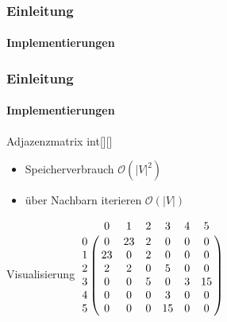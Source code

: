 \begin{frame}
    \frametitle{Einleitung}
    \framesubtitle{Implementierungen}
\end{frame}

\begin{frame}
    \frametitle{Einleitung}
    \framesubtitle{Implementierungen}
    \begin{KITexampleblock}{Adjazenzmatrix}
    int[][]
    \begin{itemize}
        \item Speicherverbrauch \( \mathcal{O}(|V|^2)\)
        \item über Nachbarn iterieren \( \mathcal{O}(|V|)\)
    \end{itemize}
    \end{KITexampleblock}
    \vspace{0.001em}
    \begin{KITinfoblock}{Visualisierung}
        $\bordermatrix{
  & 0  & 1  & 2  & 3  & 4  & 5  \cr
0 & 0  & 23 & 2  & 0  & 0  & 0  \cr
1 & 23 & 0  & 2  & 0  & 0  & 0  \cr
2 & 2  & 2  & 0  & 5  & 0  & 0  \cr
3 & 0  & 0  & 5  & 0  & 3  & 15 \cr
4 & 0  & 0  & 0  & 3  & 0  & 0  \cr
5 & 0  & 0  & 0  & 15 & 0  & 0  \cr
} $ %
    \end{KITinfoblock}
\end{frame}

